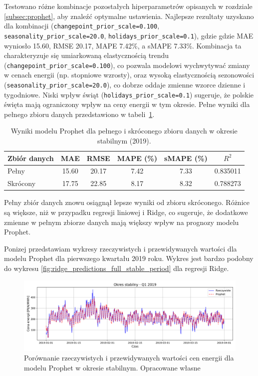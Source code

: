Testowano różne kombinacje pozostałych hiperparametrów opisanych w rozdziale \ref{subsec:prophet}, aby znaleźć optymalne ustawienia. Najlepsze rezultaty uzyskano dla kombinacji (\texttt{changepoint\_prior\_scale=0.100}, \texttt{seasonality\_prior\_scale=20.0}, \texttt{holidays\_prior\_scale=0.1}), gdzie gdzie MAE wyniosło 15.60, RMSE 20.17, MAPE 7.42\%, a sMAPE 7.33\%. Kombinacja ta charakteryzuje się umiarkowaną elastycznością trendu (\texttt{changepoint\_prior\_scale=0.100}), co pozwala modelowi wychwytywać zmiany w cenach energii (np. stopniowe wzrosty), oraz wysoką elastycznością sezonowości (\texttt{seasonality\_prior\_scale=20.0}), co dobrze oddaje zmienne wzorce dzienne i tygodniowe. Niski wpływ świąt (\texttt{holidays\_prior\_scale=0.1}) sugeruje, że polskie święta mają ograniczony wpływ na ceny energii w tym okresie. Pełne wyniki dla pełnego zbioru danych przedstawiono w tabeli~\ref{tab:prophet_results_combined_stable}.

\begin{table}[H]
    \centering
    \caption{Wyniki modelu Prophet dla pełnego i skróconego zbioru danych w okresie stabilnym (2019).}
    \label{tab:prophet_results_combined_stable}
    \begin{tabular}{|l|ccccc|}
        \hline
        \textbf{Zbiór danych} & \textbf{MAE} & \textbf{RMSE} & \textbf{MAPE (\%)} & \textbf{sMAPE (\%)} & \textbf{\(R^2\)} \\
        \hline
        Pełny     & 15.60 & 20.17 & 7.42 & 7.33 & 0.835011 \\
        Skrócony  & 17.75 & 22.85 & 8.17 & 8.32 & 0.788273 \\
        \hline
    \end{tabular}
\end{table}

Pełny zbiór danych znowu osiągnął lepsze wyniki od zbioru skróconego. Różnice są większe, niż w przypadku regresji liniowej i Ridge, co sugeruje, że dodatkowe zmienne w pełnym zbiorze danych mają większy wpływ na prognozy modelu Prophet.

Ponizej przedstawiam wykresy rzeczywistych i przewidywanych wartości dla modelu Prophet dla pierwszego kwartału 2019 roku. Wykres jest bardzo podobny do wykresu \ref{fig:ridge_predictions_full_stable_period} dla regresji Ridge.

\begin{figure}[H]
    \centering
    \includegraphics[width=1.0\textwidth]{../../plots/predicts/Prophet_predictions_stable_Q1.png}
    \caption{Porównanie rzeczywistych i przewidywanych wartości cen energii dla modelu Prophet w okresie stabilnym. Opracowane własne}
    \label{fig:prophet_predictions_stable_period}
\end{figure}

